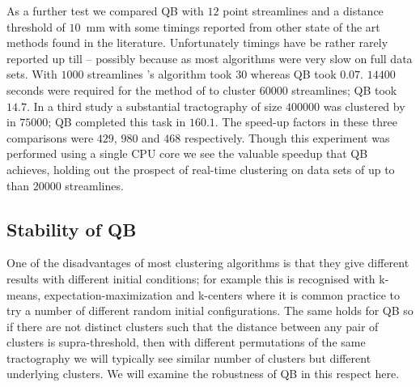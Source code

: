 \documentclass{bioinfo}
\begin{document}
As a further test we compared QB with $12$ point streamlines and a
distance threshold of $10$~mm with some timings reported from other
state of the art methods found in the literature. Unfortunately timings
have be rather rarely reported up till -- possibly because as most
algorithms were very slow on full data sets. With $\num{1000}$
streamlines \citet{wang2010tractography}'s algorithm took $30$ whereas
QB took $0.07$.  $\num{14400}$ seconds were required for the method of
\citet{wang2010tractography} to cluster $\num{60000}$ streamlines; QB
took $14.7$.  In a third study a substantial tractography of size
$\num{400000}$ was clustered by \citet{Visser2010} in $\num{75000}$; QB
completed this task in $160.1$. The speed-up factors in these three
comparisons were $429$, $980$ and $468$ respectively.  Though this
experiment was performed using a single CPU core we see the valuable
speedup that QB achieves, holding out the prospect of real-time
clustering on data sets of up to than \num{20000} streamlines.


\subsection{Stability of QB\label{sub:Comparisons}}

One of the disadvantages of most clustering algorithms is that they give
different results with different initial conditions; for example this is
recognised with k-means, expectation-maximization
\citep{dempster1977maximum} and k-centers \citep{gonzalez1985clustering}
where it is common practice to try a number of different random initial
configurations. The same holds for QB so if there are not distinct
clusters such that the distance between any pair of clusters is
supra-threshold, then with different permutations of the same
tractography we will typically see similar number of clusters but
different underlying clusters. We will examine the robustness of QB in
this respect here.
\end{document}
